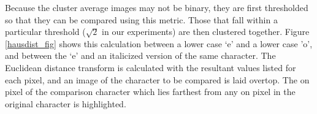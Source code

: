 \documentclass[times, 10pt,twocolumn]{article}
\begin{document}
Because the cluster average images may not be 
binary, they are first thresholded so that they can be compared using
this metric.
%
Those that fall within a particular threshold ($\sqrt 2$ in our
experiments) are then clustered together.  Figure \ref{hausdist_fig}
shows this calculation between a lower case `e' and a lower case 'o', and
between the `e' and an italicized version of the same character.  The Euclidean
distance transform is calculated with the resultant values listed for each
pixel, and an image of the character to be compared is laid overtop.  The on 
pixel of the comparison character which lies farthest from any on pixel in the
original character is highlighted. 
\end{document}
